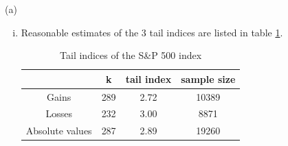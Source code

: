 \documentclass{report}
\begin{document}
\begin{enumerate}[1.]
\begin{enumerate}{(a)}
\begin{enumerate}[(i)]
    \item Reasonable estimates of the 3 tail indices are listed in
      table \ref{tab:SP500_tail_indices}.
      \begin{table}[htb!]
        \centering
        \begin{tabular}{c|c|c|c}
          & k & tail index & sample size\\
          \hline
          Gains & 289 & 2.72 & 10389\\
          \hline
          Losses & 232 & 3.00 & 8871\\
          \hline
          Absolute values & 287 & 2.89 & 19260\\
        \end{tabular}
        \caption{Tail indices of the S\&P 500 index}
        \label{tab:SP500_tail_indices}
      \end{table}


\end{enumerate}
\end{enumerate}
\end{enumerate}
\end{document}
